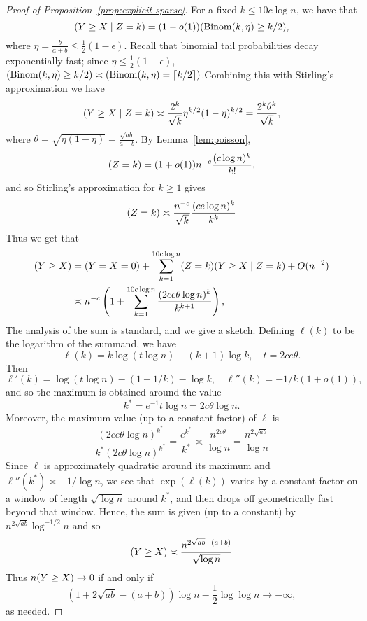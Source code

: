 \documentclass[EJP,final]{ejpecp}
\newcommand{\1}[1]{\mathbbm{1}_{\{#1\}}}
\newcommand{\eps}{\epsilon}
\let\Pr\relax
\DeclareMathOperator{\Pr}{Pr}
\DeclareMathOperator{\Binom}{Binom}
\begin{document}
\begin{proof}[Proof of Proposition~\ref{prop:explicit-sparse}]
For a fixed $k \leq 10 c \log n$, we have that
\[
\Pr(Y \geq X \mid Z = k) = (1-o(1)) \Pr(\Binom(k,\eta) \geq k/2),
\]
where $\eta = \frac{b}{a+b} \le \frac 12 (1-\eps)$.
Recall that binomial tail probabilities decay exponentially fast; since $\eta \le \frac 12 (1-\eps)$,
$\Pr(\Binom(k,\eta) \ge k/2) \asymp \Pr(\Binom(k,\eta) = \lceil k/2 \rceil)$.Combining this
with Stirling's approximation we have
\[
\Pr(Y \geq X \mid Z = k) \asymp \frac{2^k}{\sqrt{k}} \eta^{k/2}(1-\eta)^{k/2} = \frac{2^k \theta^k}{\sqrt{k}},
\]
where $\theta = \sqrt{\eta(1-\eta)} = \frac{\sqrt{a b}}{a+b}$.
By Lemma~\ref{lem:poisson},
\[
\Pr(Z = k) = (1+o(1)) n^{-c} \frac{(c \log n)^k}{k!},
\]
and so Stirling's approximation for $k \ge 1$ gives
\[
\Pr(Z = k) \asymp \frac{n^{-c}}{\sqrt{k}} \frac{(c e \log n)^k}{k^k}
\]
Thus we get that
\begin{align*}
\Pr(Y \geq X) &= \Pr(Y = X = 0) + \sum_{k=1}^{10 c \log n} \Pr(Z = k) \Pr(Y \geq X \mid Z = k) +
O(n^{-2}) \\
& \asymp n^{-c} \left( 1+ \sum_{k=1}^{10 c \log n} \frac{(2 c e \theta \log n)^k}{k^{k+1}} \right),
\end{align*}
The analysis of the sum is standard, and we give a sketch. Defining $\ell(k)$ to be the
logarithm of the summand, we have
\[
\ell(k) = k \log (t \log n) - (k+1) \log k, \quad t = 2 c e \theta.
\]
Then
\[
\ell'(k) = \log (t \log n) - (1+1/k) - \log k, \quad \ell''(k) = -1/k(1+o(1)),
\]
and so the maximum is obtained around the value
\[
k^{\ast} = e^{-1} t \log n = 2 c \theta \log n.
\]
Moreover, the maximum value (up to a constant factor) of $\ell$ is
\[
\frac{(2 c e \theta \log n)^{k^{\ast}}}{k^\ast (2 c \theta \log n)^{k^{\ast}}} =
\frac{e^{k^{\ast}}}{k^{\ast}} \asymp \frac{n^{2c \theta}}{\log n} =
\frac{n^{2\sqrt{ab}}}{\log n}
\]
Since $\ell$ is approximately quadratic around its maximum and $\ell''(k^\ast) \asymp -1/\log n$,
we see that $\exp(\ell(k))$ varies by a constant factor on a window of length $\sqrt{\log n}$
around $k^\ast$, and then drops off geometrically fast beyond that window. Hence, the sum
is given (up to a constant) by $n^{2\sqrt{ab}} \log^{-1/2} n$
and so
\[
  \Pr(Y \ge X) \asymp
  \frac{n^{2\sqrt{ab} - (a+b)}}{\sqrt{\log n}}
\]
Thus $n \Pr(Y \geq X) \to 0$ if and only if
\[
(1+2 \sqrt{ab}-(a+b))\log n - \frac 12 \log \log n \to -\infty,
\]
as needed.
\end{proof}
\end{document}
